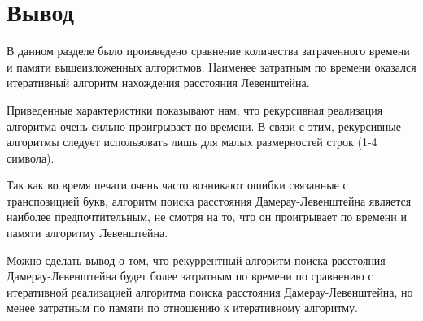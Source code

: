 \clearpage

\section{Вывод}
В данном разделе было произведено сравнение количества затраченного времени и памяти вышеизложенных алгоритмов. Наименее затратным по времени оказался итеративный алгоритм нахождения расстояния Левенштейна.

Приведенные характеристики показывают нам, что рекурсивная реализация алгоритма очень сильно проигрывает по времени. В связи с этим, рекурсивные алгоритмы следует использовать лишь для малых размерностей строк (1-4 символа).

Так как во время печати очень часто возникают ошибки связанные с транспозицией букв, алгоритм поиска расстояния Дамерау-Левенштейна является наиболее предпочтительным, не смотря на то, что он проигрывает по времени и памяти алгоритму Левенштейна.

Можно сделать вывод о том, что рекуррентный алгоритм поиска расстояния Дамерау-Левенштейна будет более затратным по времени по сравнению с итеративной реализацией алгоритма поиска расстояния Дамерау-Левенштейна, но менее затратным по памяти по отношению к итеративному алгоритму.
